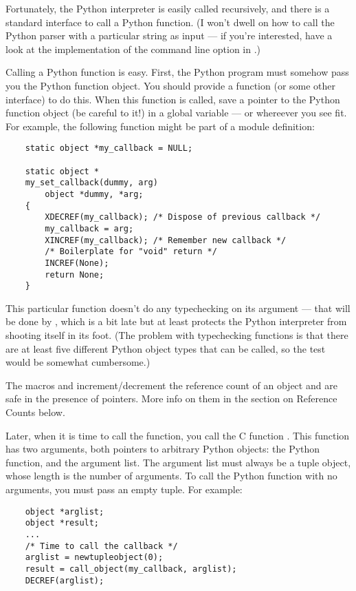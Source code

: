 Fortunately, the Python interpreter is easily called recursively, and
there is a standard interface to call a Python function.  (I won't
dwell on how to call the Python parser with a particular string as
input --- if you're interested, have a look at the implementation of
the  command line option in .)

Calling a Python function is easy.  First, the Python program must
somehow pass you the Python function object.  You should provide a
function (or some other interface) to do this.  When this function is
called, save a pointer to the Python function object (be careful to
 it!) in a global variable --- or whereever you see fit.
For example, the following function might be part of a module
definition:

\begin{verbatim}
    static object *my_callback = NULL;

    static object *
    my_set_callback(dummy, arg)
        object *dummy, *arg;
    {
        XDECREF(my_callback); /* Dispose of previous callback */
        my_callback = arg;
        XINCREF(my_callback); /* Remember new callback */
        /* Boilerplate for "void" return */
        INCREF(None);
        return None;
    }
\end{verbatim}

This particular function doesn't do any typechecking on its argument
--- that will be done by , which is a bit late but
at least protects the Python interpreter from shooting itself in its
foot.  (The problem with typechecking functions is that there are at
least five different Python object types that can be called, so the
test would be somewhat cumbersome.)

The macros  and  increment/decrement
the reference count of an object and are safe in the presence of
 pointers.  More info on them in the section on Reference
Counts below.

Later, when it is time to call the function, you call the C function
.  This function has two arguments, both pointers
to arbitrary Python objects: the Python function, and the argument
list.  The argument list must always be a tuple object, whose length
is the number of arguments.  To call the Python function with no
arguments, you must pass an empty tuple.  For example:

\begin{verbatim}
    object *arglist;
    object *result;
    ...
    /* Time to call the callback */
    arglist = newtupleobject(0);
    result = call_object(my_callback, arglist);
    DECREF(arglist);
\end{verbatim}

